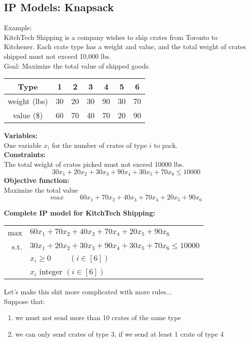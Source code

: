 \documentclass[letterpaper, 12pt]{article}
\begin{document}
{    \pagebreak
    \subsection{IP Models: Knapsack}
    Example:\\
    KitchTech Shipping is a company wishes to ship crates from Toronto to Kitchener.
    Each crate type has a weight and value, and the total weight of crates shipped must not exceed 10,000 lbs.\\
    Goal: Maximize the total value of shipped goods.\\
    \bigskip
    \begin{center}
        \begin{tabular}{|c|c|c|c|c|c|c|}
            \hline
            Type & 1 & 2 & 3 & 4 & 5 & 6\\
            \hline
            weight (lbs) & 30 & 20 & 30 & 90 & 30 & 70\\
            \hline
            value (\$) & 60 & 70 & 40 & 70 & 20 & 90\\
            \hline
        \end{tabular}
    \end{center}

    \bigskip
    \textbf{Variables:}\\
    One variable $x_i$ for the number of crates of type $i$ to pack.\\
    \bigskip
    \textbf{Constraints:}\\
    The total weight of crates picked must not exceed 10000 lbs.\\
    $$30x_1 + 20x_2 + 30x_3 + 90x_4 + 30x_5 + 70x_6 \leq 10000$$
    \textbf{Objective function:}\\
    Maximize the total value\\
    $$max \hspace{1cm} 60x_1 + 70x_2 + 40x_3 + 70x_4 + 20x_5 + 90x_6$$

    \textbf{Complete IP model for KitchTech Shipping:}\\
    \begin{center}
        \begin{tabular}{rl}
            max & $60x_1 + 70x_2 + 40x_3 + 70x_4 + 20x_5 + 90x_6$\\
            s.t. & $30x_1 + 20x_2 + 30x_3 + 90x_4 + 30x_5 + 70x_6 \leq 10000$\\
            & $x_i \geq 0 \hspace{1cm} (i\in[6])$\\
            & $x_i$ integer $(i \in [6])$\\
        \end{tabular} 
    \end{center}
    
    Let's make this shit more complicated with more rules...\\
    Suppose that:
    \begin{enumerate}
        \item we must not send more than 10 crates of the same type
        \item we can only send crates of type 3, if we send at least 1 crate of type 4
    \end{enumerate}}
\end{document}
